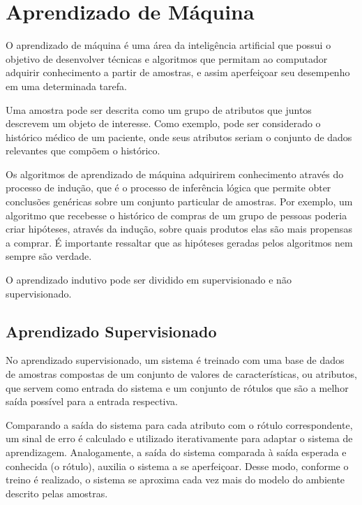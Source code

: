 \chapter{Aprendizado de Máquina}
\label{chap:cap1}
 
 O aprendizado de máquina é uma área da inteligência artificial que possui o objetivo de desenvolver técnicas e algoritmos que permitam ao computador adquirir conhecimento a partir de amostras, e assim aperfeiçoar seu desempenho em uma determinada tarefa.\cite{goldschmidt}
 
 Uma amostra pode ser descrita como um grupo de atributos que juntos descrevem um objeto de interesse. Como exemplo, pode ser considerado o histórico médico de um paciente, onde seus atributos seriam o conjunto de dados relevantes que compõem o histórico.
 
 Os algoritmos de aprendizado de máquina adquirirem conhecimento através do processo de indução, que é o processo de inferência lógica que permite obter conclusões genéricas sobre um conjunto particular de amostras. Por exemplo, um algoritmo que recebesse o histórico de compras de um grupo de pessoas poderia criar hipóteses, através da indução, sobre quais produtos elas são mais propensas a comprar. É importante ressaltar que as hipóteses geradas pelos algoritmos nem sempre são verdade.\cite{Monard2003a}
 
 O aprendizado indutivo pode ser dividido em supervisionado e não supervisionado. \cite{Monard2003a}
 

\section{Aprendizado Supervisionado}
\label{sec:superv}

 No aprendizado supervisionado, um sistema é treinado com uma base de dados de amostras compostas de um conjunto de valores de características, ou atributos, que servem como entrada do sistema e um conjunto de rótulos que são a melhor saída possível para a entrada respectiva. 
 
 Comparando a saída do sistema para cada atributo com o rótulo correspondente, um sinal de erro é calculado e utilizado iterativamente para adaptar o sistema de aprendizagem. Analogamente, a saída do sistema comparada à saída esperada e conhecida (o rótulo), auxilia o sistema a se aperfeiçoar. Desse modo, conforme o treino é realizado, o sistema se aproxima cada vez mais do modelo do ambiente descrito pelas amostras. 
 

